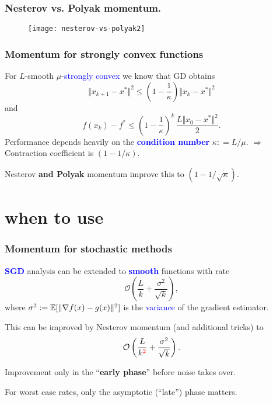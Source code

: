 \documentclass[aspectratio=149]{beamer}
\begin{document}
\begin{frame}
  \frametitle{Nesterov vs. Polyak momentum.}
  \vspace{-0.2cm}
  \begin{figure}[ht]
    \centering
    \texttt{[image: nesterov-vs-polyak2]}
  \end{figure}
\end{frame}

\begin{frame}
  \frametitle{Momentum for strongly convex functions}

  For $L$-smooth $\mu$-\textcolor{blue}{strongly convex} we know that GD obtains
  \begin{equation}
    \Vert x_{k+1} - x^* \Vert^2 \le \left(1 - \frac{1}{\kappa}\right) \Vert x_k -x^* \Vert^2
  \end{equation}
  and
  \begin{equation}
    f(x_k)-f^* \le {\left(1-\frac{1}{\kappa}\right)}^k \, \frac{L \Vert x_0 -x^* \Vert^2}{2}.
  \end{equation}
  Performance depends heavily on the \textbf{\textcolor{blue}{condition number}} $\kappa : = L/\mu$.
  $\Rightarrow$ Contraction coefficient is $(1-1/\kappa)$.
  \begin{block}{}
    \center
  Nesterov \textbf{and Polyak} momentum improve this to $(1-1/\sqrt{\kappa})$.
  \end{block}

\end{frame}


\section{when to use}%
\label{sec:}

\begin{frame}
  \frametitle{Momentum for stochastic methods}
  \textbf{\textcolor{blue}{SGD}} analysis can be extended to \textbf{\textcolor{blue}{smooth}} functions with rate
  \begin{equation}
    \mathcal{O}\left(\frac{L}{k} + \frac{\sigma^2}{\sqrt{k}}\right),
  \end{equation}
  where $\sigma^2:= \mathbb{E} [ \Vert \nabla f(x) - g(x) \Vert^2 ]$ is the \textcolor{blue}{variance} of the gradient estimator.

  \medskip
  This can be improved by Nesterov momentum (and additional tricks) to
  \begin{equation}
    \mathcal{O}\left(\frac{L}{k^{\textcolor{red}{2}}} + \frac{\sigma^2}{\sqrt{k}}\right).
  \end{equation}

  Improvement only in the ``\textbf{early phase}'' before noise takes over.

  \begin{block}{}
    \centering
    For worst case rates, only the asymptotic (``late'') phase matters.
  \end{block}
\end{frame}
\end{document}
